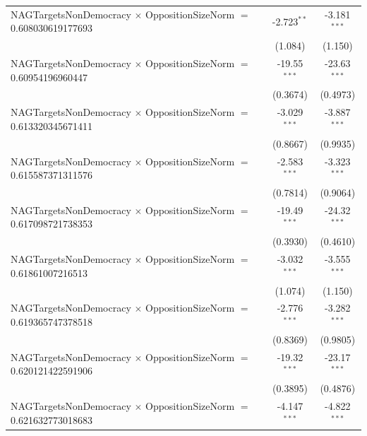\begin{tabular}{lcc}
   NAGTargetsNonDemocracy $\times$ OppositionSizeNorm $=$ 0.608030619177693     & -2.723$^{**}$        & -3.181$^{***}$\\   
                                                                                & (1.084)              & (1.150)\\   
   NAGTargetsNonDemocracy $\times$ OppositionSizeNorm $=$ 0.60954196960447      & -19.55$^{***}$       & -23.63$^{***}$\\   
                                                                                & (0.3674)             & (0.4973)\\   
   NAGTargetsNonDemocracy $\times$ OppositionSizeNorm $=$ 0.613320345671411     & -3.029$^{***}$       & -3.887$^{***}$\\   
                                                                                & (0.8667)             & (0.9935)\\   
   NAGTargetsNonDemocracy $\times$ OppositionSizeNorm $=$ 0.615587371311576     & -2.583$^{***}$       & -3.323$^{***}$\\   
                                                                                & (0.7814)             & (0.9064)\\   
   NAGTargetsNonDemocracy $\times$ OppositionSizeNorm $=$ 0.617098721738353     & -19.49$^{***}$       & -24.32$^{***}$\\   
                                                                                & (0.3930)             & (0.4610)\\   
   NAGTargetsNonDemocracy $\times$ OppositionSizeNorm $=$ 0.61861007216513      & -3.032$^{***}$       & -3.555$^{***}$\\   
                                                                                & (1.074)              & (1.150)\\   
   NAGTargetsNonDemocracy $\times$ OppositionSizeNorm $=$ 0.619365747378518     & -2.776$^{***}$       & -3.282$^{***}$\\   
                                                                                & (0.8369)             & (0.9805)\\   
   NAGTargetsNonDemocracy $\times$ OppositionSizeNorm $=$ 0.620121422591906     & -19.32$^{***}$       & -23.17$^{***}$\\   
                                                                                & (0.3895)             & (0.4876)\\   
   NAGTargetsNonDemocracy $\times$ OppositionSizeNorm $=$ 0.621632773018683     & -4.147$^{***}$       & -4.822$^{***}$\\   

\end{tabular}
